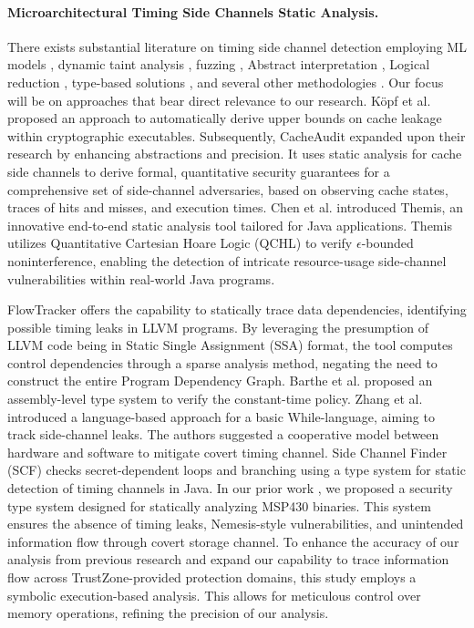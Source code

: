 \paragraph{Microarchitectural Timing Side Channels Static Analysis.} There exists substantial literature on timing side channel detection employing ML models \cite{MLforSC, chiappetta2016realtime, allaf2017comparison}, dynamic taint analysis \cite{graa2017detection}, fuzzing \cite{nilizadeh2018diffuzz}, Abstract interpretation \cite{kopf2012automatic, doychev2015cacheaudit}, Logical reduction \cite{chen2017precise}, type-based solutions \cite{MantelAVR, scfmsp, barthe2014system, rodrigues2016sparse, zhang2012languagebased, lux2011tool}, and several other methodologies \cite{timingattack, akram2020sherlock, szefer2019survey}. Our focus will be on approaches that bear direct relevance to our research. Köpf et al. \cite{kopf2012automatic} proposed an approach to automatically derive upper bounds on cache leakage within cryptographic executables. Subsequently, CacheAudit \cite{doychev2015cacheaudit} expanded upon their research by enhancing abstractions and precision. It uses static analysis for cache side channels to derive formal, quantitative security guarantees for a comprehensive set of side-channel adversaries, based on observing cache states, traces of hits and misses, and execution times. Chen et al. \cite{chen2017precise} introduced Themis, an innovative end-to-end static analysis tool tailored for Java applications. Themis utilizes Quantitative Cartesian Hoare Logic (QCHL) to verify $\epsilon$-bounded noninterference, enabling the detection of intricate resource-usage side-channel vulnerabilities within real-world Java programs. 

FlowTracker \cite{rodrigues2016sparse} offers the capability to statically trace data dependencies, identifying possible timing leaks in LLVM programs. By leveraging the presumption of LLVM code being in Static Single Assignment (SSA) format, the tool computes control dependencies through a sparse analysis method, negating the need to construct the entire Program Dependency Graph. Barthe et al. \cite{barthe2014system} proposed an assembly-level type system to verify the constant-time policy. Zhang et al. \cite{zhang2012languagebased} introduced a language-based approach for a basic While-language, aiming to track side-channel leaks. The authors suggested a cooperative model between hardware and software to mitigate covert timing channel. Side Channel Finder (\ac{SCF}) \cite{lux2011tool} checks secret-dependent loops and branching using a type system for static detection of timing channels in Java. In our prior work \cite{scfmsp}, we proposed a security type system designed for statically analyzing MSP430 binaries. This system ensures the absence of timing leaks, Nemesis-style vulnerabilities, and unintended information flow through covert storage channel. To enhance the accuracy of our analysis from previous research and expand our capability to trace information flow across TrustZone-provided protection domains, this study employs a symbolic execution-based analysis. This allows for meticulous control over memory operations, refining the precision of our analysis.

